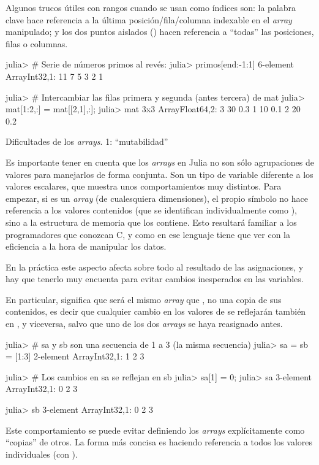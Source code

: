 ﻿\documentclass[spanish]{article}
\begin{document}
Algunos trucos útiles con rangos cuando se usan como índices son: la palabra clave  hace referencia a la última posición/fila/columna indexable en el \emph{array} manipulado; y los dos puntos aislados (\code{:}) hacen referencia a ``todas'' las posiciones, filas o columnas.

julia> # Serie de números primos al revés:
julia> primos[end:-1:1]
6-element Array{Int32,1}:
 11
 7
 5
 3
 2
 1

julia> # Intercambiar las filas primera y segunda (antes tercera) de mat
julia> mat[1:2,:] = mat[[2,1],:];
julia> mat
3x3 Array{Float64,2}:
 3 30 0.3
 1 10 0.1
 2 20 0.2

Dificultades de los \emph{arrays}. 1: ``mutabilidad''

Es importante tener en cuenta que los \emph{arrays} en Julia no son sólo agrupaciones de valores para manejarlos de forma conjunta. Son un tipo de variable diferente a los valores escalares, que muestra unos comportamientos muy distintos. Para empezar, si  es un \emph{array} (de cualesquiera dimensiones), el propio símbolo  no hace referencia a los valores contenidos (que se identifican individualmente como ), sino a la estructura de memoria que los contiene. Esto resultará familiar a los programadores que conozcan C, y como en ese lenguaje tiene que ver con la eficiencia a la hora de manipular los datos.

En la práctica este aspecto afecta sobre todo al resultado de las asignaciones, y hay que tenerlo muy encuenta para evitar cambios inesperados en las variables.

En particular,  significa que  será el mismo \emph{array} que , no una copia de sus contenidos, es decir que cualquier cambio en los valores de  se reflejarán también en , y viceversa, salvo que uno de los dos \emph{arrays} se haya reasignado antes.

julia> # sa y sb son una secuencia de 1 a 3 (la misma secuencia)
julia> sa = sb = [1:3]
2-element Array{Int32,1}:
 1 2 3

julia> # Los cambios en sa se reflejan en sb
julia> sa[1] = 0;
julia> sa
3-element Array{Int32,1}:
 0 2 3

julia> sb 3-element
Array{Int32,1}:
 0 2 3

Este comportamiento se puede evitar definiendo los \emph{arrays} explícitamente como ``copias'' de otros. La forma más concisa es haciendo referencia a todos los valores individuales (con \code{[:]}).
\end{document}
